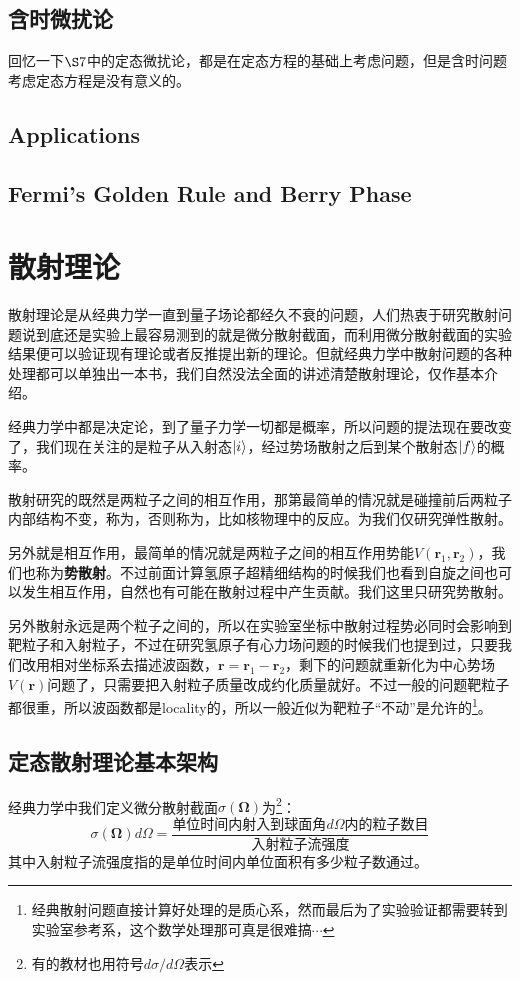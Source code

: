 \documentclass[a4paper,zihao=-4,linespread=1]{ctexrep}
\begin{document}
	\section{含时微扰论}
	回忆一下$\S 7$中的定态微扰论，都是在定态方程的基础上考虑问题，但是含时问题考虑定态方程是没有意义的。
	
	\section{Applications}
	
	\section{Fermi's Golden Rule and Berry Phase}
	
	
    \chapter{散射理论}
	散射理论是从经典力学一直到量子场论都经久不衰的问题，人们热衷于研究散射问题说到底还是实验上最容易测到的就是微分散射截面，而利用微分散射截面的实验结果便可以验证现有理论或者反推提出新的理论。但就经典力学中散射问题的各种处理都可以单独出一本书，我们自然没法全面的讲述清楚散射理论，仅作基本介绍。
	
	经典力学中都是决定论，到了量子力学一切都是概率，所以问题的提法现在要改变了，我们现在关注的是粒子从入射态$\ket{i}$，经过势场散射之后到某个散射态$\ket{f}$的概率。
	
	散射研究的既然是两粒子之间的相互作用，那第最简单的情况就是碰撞前后两粒子内部结构不变，称为，否则称为，比如核物理中的反应。为我们仅研究弹性散射。
	
	另外就是相互作用，最简单的情况就是两粒子之间的相互作用势能$V(\mathbf{r}_1,\mathbf{r}_2)$，我们也称为\textbf{势散射}。不过前面计算氢原子超精细结构的时候我们也看到自旋之间也可以发生相互作用，自然也有可能在散射过程中产生贡献。我们这里只研究势散射。
	
	另外散射永远是两个粒子之间的，所以在实验室坐标中散射过程势必同时会影响到靶粒子和入射粒子，不过在研究氢原子有心力场问题的时候我们也提到过，只要我们改用相对坐标系去描述波函数，$\mathbf{r}=\mathbf{r}_1-\mathbf{r}_2$，剩下的问题就重新化为中心势场$V(\mathbf{r})$问题了，只需要把入射粒子质量改成约化质量就好。不过一般的问题靶粒子都很重，所以波函数都是locality的，所以一般近似为靶粒子“不动”是允许的\footnote{经典散射问题直接计算好处理的是质心系，然而最后为了实验验证都需要转到实验室参考系，这个数学处理那可真是很难搞$\cdots$}。
	
	\section{定态散射理论基本架构}
	经典力学中我们定义微分散射截面$\sigma(\mathbf{\Omega})$为\footnote{有的教材也用符号$d\sigma/d\Omega$表示}：
	\begin{equation}
		\label{eq:11.1}
		\sigma(\mathbf{\Omega})d\Omega=\frac{\text{单位时间内射入到球面角$d\Omega$内的粒子数目}}{\text{入射粒子流强度}}
	\end{equation}
	其中入射粒子流强度指的是单位时间内单位面积有多少粒子数通过。
	
\end{document}
